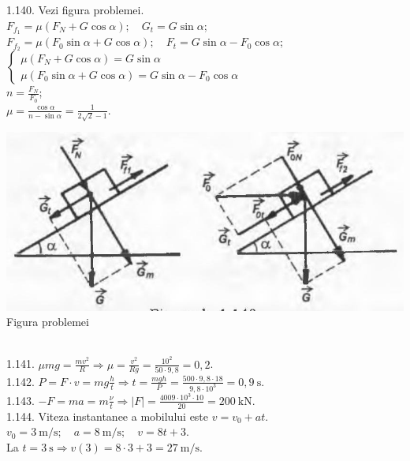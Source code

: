 1.140. Vezi figura problemei.\\ $F_{f_{1}}=\mu\left(F_{N}+G \cos \alpha\right); \quad G_{t}=G \sin \alpha$;\\ $F_{f_{2}}=\mu\left(F_{0} \sin \alpha+G \cos \alpha\right); \quad F_{t}=G \sin \alpha-F_{0} \cos \alpha$;\\ $\left\{\begin{array}{l} \mu\left(F_{N}+G \cos \alpha\right)=G \sin \alpha\\ \mu\left(F_{0} \sin \alpha+G \cos \alpha\right)=G \sin \alpha-F_{0} \cos \alpha \end{array}\right.$\\ $n=\frac{F_{N}}{F_{0}}$;\\ $\mu=\frac{\cos \alpha}{n-\sin \alpha}=\frac{1}{2 \sqrt{2}-1}$.\\ \begin{center} \includegraphics[width=0.4\linewidth]{images/2025_07_01_5b3ff9fa0d508c8e9f17g-227}\\ Figura problemei \end{center}\\

1.141. $\mu m g=\frac{m v^{2}}{R} \Rightarrow \mu=\frac{v^{2}}{R g}=\frac{10^{2}}{50 \cdot 9,8}=0,2$.\\

1.142. $P=F \cdot v=m g \frac{h}{t} \Rightarrow t=\frac{m g h}{P}=\frac{500 \cdot 9,8 \cdot 18}{9,8 \cdot 10^{3}}=0,9 \mathrm{~s}$.\\

1.143. $-F=m a=m \frac{\nu}{t} \Rightarrow|F|=\frac{4009 \cdot 10^{3} \cdot 10}{20}=200 \mathrm{~kN}$.\\

1.144. Viteza instantanee a mobilului este $v=v_{0}+a t$.\\ $v_{0}=3 \mathrm{~m} / \mathrm{s}; \quad a=8 \mathrm{~m} / \mathrm{s}; \quad v=8 t+3$.\\ La $t=3 \mathrm{~s} \Rightarrow v(3)=8 \cdot 3+3=27 \mathrm{~m} / \mathrm{s}$.\\

